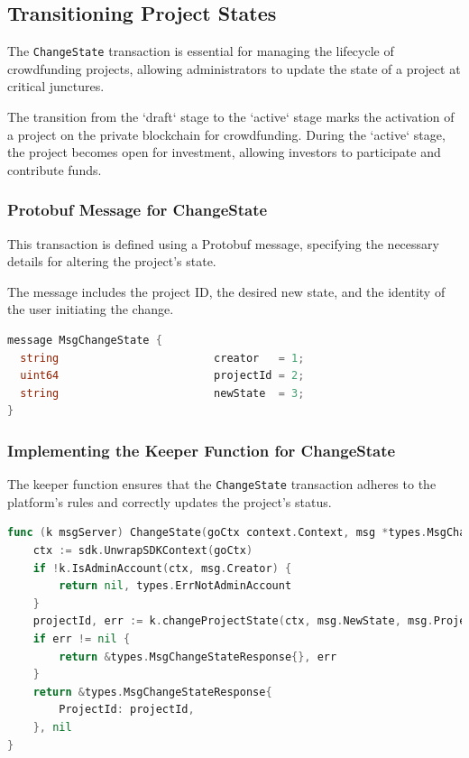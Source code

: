 \subsection{Transitioning Project States}

The \texttt{ChangeState} transaction is essential for managing the lifecycle of crowdfunding projects, allowing administrators to update the state of a project at critical junctures.

The transition from the `draft` stage to the `active` stage marks the activation of a project on the private blockchain for crowdfunding. During the `active` stage, the project becomes open for investment, allowing investors to participate and contribute funds.

\subsubsection{Protobuf Message for ChangeState}

This transaction is defined using a Protobuf message, specifying the necessary details for altering the project's state.

The message includes the project ID, the desired new state, and the identity of the user initiating the change.

\begin{lstlisting}[language=go, caption=ChangeState protobuf definition, label={lst:change_state_proto_implementation}]
message MsgChangeState {
  string                        creator   = 1;
  uint64                        projectId = 2;
  string                        newState  = 3;
}
\end{lstlisting}

\subsubsection{Implementing the Keeper Function for ChangeState}

The keeper function ensures that the \texttt{ChangeState} transaction adheres to the platform's rules and correctly updates the project's status.

\begin{lstlisting}[language=go, caption=Keeper implementation for ChangeState, label={lst:keeper_change_state}]
func (k msgServer) ChangeState(goCtx context.Context, msg *types.MsgChangeState) (*types.MsgChangeStateResponse, error) {
	ctx := sdk.UnwrapSDKContext(goCtx)
	if !k.IsAdminAccount(ctx, msg.Creator) {
		return nil, types.ErrNotAdminAccount
	}
	projectId, err := k.changeProjectState(ctx, msg.NewState, msg.ProjectId)
	if err != nil {
		return &types.MsgChangeStateResponse{}, err
	}
	return &types.MsgChangeStateResponse{
		ProjectId: projectId,
	}, nil
}
\end{lstlisting}


